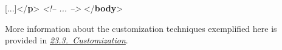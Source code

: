 \begin{shaded}
\hspace*{1em}\mbox{}\newline 
\hspace*{1em}\hspace*{1em}[...]{</\textbf{p}>}\mbox{}\newline 
\hspace*{1em}\mbox{}\newline 
{}\mbox{}\newline 
\textit{<!-- ... -->}\mbox{}\newline 
{</\textbf{body}>}\end{shaded}\egroup\par \par
More information about the customization techniques exemplified here is provided in \textit{\hyperref[MD]{23.3.\ Customization}}.
